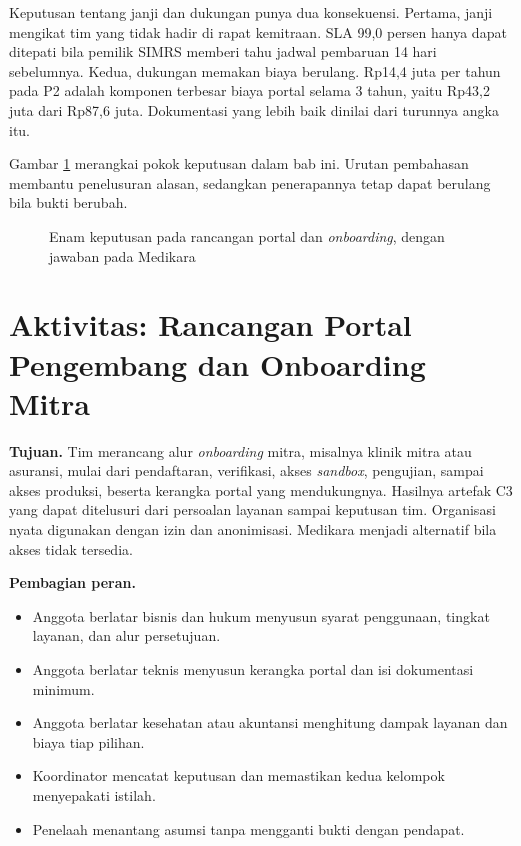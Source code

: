 Keputusan tentang janji dan dukungan punya dua konsekuensi. Pertama, janji mengikat tim yang tidak hadir di rapat kemitraan. SLA 99,0 persen hanya dapat
ditepati bila pemilik SIMRS memberi tahu jadwal pembaruan 14 hari sebelumnya. Kedua, dukungan memakan biaya berulang. Rp14,4 juta per tahun pada P2 adalah komponen
terbesar biaya portal selama 3 tahun, yaitu Rp43,2 juta dari Rp87,6 juta. Dokumentasi yang lebih baik dinilai dari turunnya angka itu.

Gambar \ref{fig:ch11-keputusan} merangkai pokok keputusan dalam bab ini. Urutan pembahasan membantu penelusuran alasan, sedangkan penerapannya tetap dapat berulang
bila bukti berubah.

\begin{figure}[!htb]
  \centering
  
  \caption{Enam keputusan pada rancangan portal dan \textit{onboarding}, dengan jawaban pada Medikara}
  \label{fig:ch11-keputusan}
\end{figure}

\section{Aktivitas: Rancangan Portal Pengembang dan Onboarding Mitra}

\textbf{Tujuan.} Tim merancang alur \textit{onboarding} mitra, misalnya klinik mitra atau asuransi, mulai dari pendaftaran, verifikasi, akses
\textit{sandbox}, pengujian, sampai akses produksi, beserta kerangka portal yang mendukungnya. Hasilnya artefak C3 yang dapat ditelusuri dari persoalan
layanan sampai keputusan tim. Organisasi nyata digunakan dengan izin dan anonimisasi. Medikara menjadi alternatif bila akses tidak tersedia.

\textbf{Pembagian peran.}
\begin{itemize}
  \item Anggota berlatar bisnis dan hukum menyusun syarat penggunaan, tingkat layanan, dan alur persetujuan.
  \item Anggota berlatar teknis menyusun kerangka portal dan isi dokumentasi minimum.
  \item Anggota berlatar kesehatan atau akuntansi menghitung dampak layanan dan biaya tiap pilihan.
  \item Koordinator mencatat keputusan dan memastikan kedua kelompok menyepakati istilah.
  \item Penelaah menantang asumsi tanpa mengganti bukti dengan pendapat.
\end{itemize}


